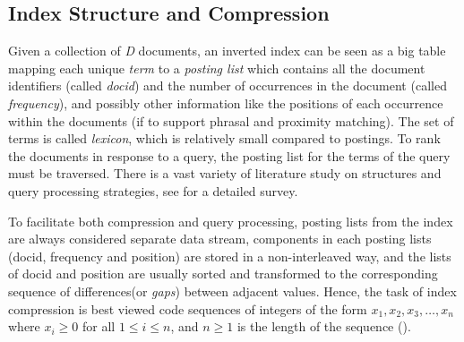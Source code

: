 \documentclass{sig-alternate-05-2015}
\begin{document}
\subsection{Index Structure and Compression}
Given a collection of \textit{D} documents, an inverted index can be seen as a big table mapping each unique \textit{term} to a\textit{ posting list} which contains all the document identifiers (called \textit{docid}) and the number of occurrences in the document (called \textit{frequency}), and possibly other information like the positions of each occurrence within the documents (if to support phrasal and proximity matching).
The set of terms is called \textit{lexicon}, which is relatively small compared to postings.
To rank the documents in response to a query, the posting list for the terms of the query must be traversed.
There is a vast variety of literature study on structures and query processing strategies, see \cite{ding2011faster,konow2013faster,navarro2010dual} for a detailed survey.


To facilitate both compression and query processing, posting lists from the index are always considered separate data stream, components in each posting lists (docid, frequency and position) are stored in a non-interleaved way, and the lists of docid and position are usually sorted and transformed to the corresponding sequence of differences(or \textit{gaps}) between adjacent values.
Hence, the task of index compression is best viewed code sequences of integers of the form $x_{1},x_{2},x_{3},\ldots,x_{n}$ where $x_{i}\geqslant0$ for all $1\leqslant i\leqslant n$, and $n\geqslant1$ is the length of the sequence (\cite{anh2010index}).
\end{document}
